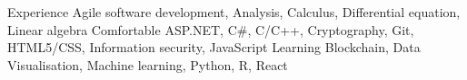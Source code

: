 
\begin{cvskills}
	\cvskill
		{Experience}
		{Agile software development,\enskip 
		Analysis,\enskip
		Calculus,\enskip
		Differential equation, \enskip
		Linear algebra}
	\cvskill
		{Comfortable}
		{ASP.NET,\enskip 
		C\#, \enskip
		C/C++,\enskip
		Cryptography,\enskip
		Git,\enskip
		HTML5/CSS, \enskip
		Information security,\enskip 	
		JavaScript}
	\cvskill
		{Learning}
		{Blockchain,\enskip 
		Data Visualisation,\enskip
		Machine learning, \enskip
		Python,\enskip
		R,\enskip
		React}
\end{cvskills}

